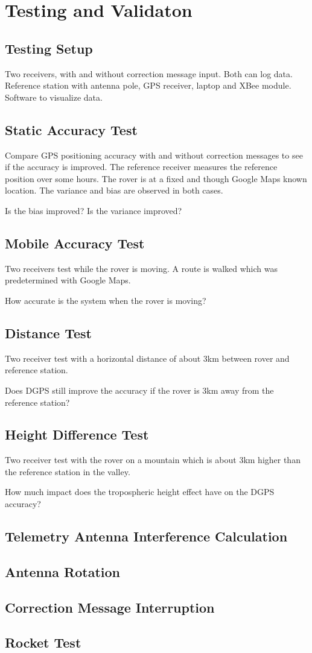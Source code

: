 \chapter{Testing and Validaton}

\section{Testing Setup}
Two receivers, with and without correction message input.
Both can log data.
Reference station with antenna pole, GPS receiver, laptop and XBee module.
Software to visualize data.

\section{Static Accuracy Test}
Compare GPS positioning accuracy with and without correction messages to see if the accuracy is improved.
The reference receiver measures the reference position over some hours.
The rover is at a fixed and though Google Maps known location.
The variance and bias are observed in both cases.

Is the bias improved?
Is the variance improved?

\section{Mobile Accuracy Test}
Two receivers test while the rover is moving.
A route is walked which was predetermined with Google Maps.

How accurate is the system when the rover is moving?

\section{Distance Test}
Two receiver test with a horizontal distance of about 3km between rover and reference station.

Does DGPS still improve the accuracy if the rover is 3km away from the reference station?

\section{Height Difference Test}

Two receiver test with the rover on a mountain which is about 3km higher than the reference station in the valley.

How much impact does the tropospheric height effect have on the DGPS accuracy?

\section{Telemetry Antenna Interference Calculation}

\section{Antenna Rotation}

\section{Correction Message Interruption}

\section{Rocket Test}
